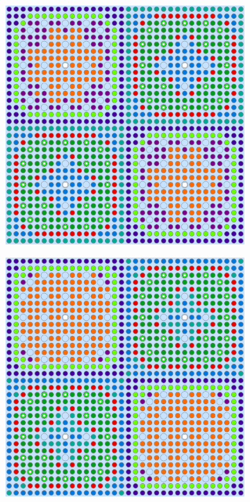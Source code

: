 \begin{appendices}
\begin{figure}[h!]
\centering
\begin{subfigure}{0.48\textwidth}
  \centering
  \includegraphics[width=0.95\linewidth]{figures/unsupervised/geometries/dimension-reduce/2x2/no-reduce}
  \caption{}
  \label{fig:2x2-combined-no-reduce}
\end{subfigure}%
\begin{subfigure}{0.48\textwidth}
  \centering
  \includegraphics[width=0.95\linewidth]{figures/unsupervised/geometries/dimension-reduce/2x2/pca}

\end{subfigure}
\end{figure}
\end{appendices}

